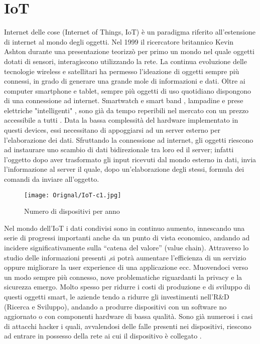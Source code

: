 \chapter{IoT}
Internet delle cose (Internet of Things, IoT) è un paradigma riferito
all’estensione di internet al mondo degli oggetti. Nel 1999 il ricercatore
britannico Kevin Ashton durante una presentazione teorizzò  per primo un mondo
nel quale oggetti dotati di sensori, interagiscono utilizzando la rete.  La
continua evoluzione delle tecnologie wireless e satellitari ha permesso
l'ideazione di oggetti sempre più connessi, in grado di generare una grande mole
di informazioni e dati. Oltre ai computer smartphone e tablet, sempre più
oggetti di uso quotidiano dispongono di una connessione ad internet. Smartwatch
e smart band , lampadine e prese elettriche "intelligenti" ,  sono già da tempo
reperibili nel mercato con un prezzo accessibile a tutti .  Data la bassa
complessità del hardware implementato in questi devices, essi necessitano di
appoggiarsi ad un server esterno per l'elaborazione dei dati.  Sfruttando la
connessione ad internet, gli oggetti riescono ad instaurare uno scambio di dati
bidirezionale tra loro ed il server; infatti l'oggetto dopo aver trasformato gli
input ricevuti dal mondo esterno in dati, invia l'informazione al server il
quale, dopo un'elaborazione degli stessi, formula dei comandi da inviare
all'oggetto.
\\
\begin{figure}[h]
        \centering 
                \texttt{[image: Orignal/IoT-c1.jpg]}
        \caption{Numero di dispositivi per anno}
\end{figure}
Nel mondo dell’IoT i dati condivisi sono in
continuo aumento, innescando una serie di progressi importanti anche da un punto
di vista economico, andando ad incidere  significativamente sulla “catena del
valore” (value chain). Attraverso lo studio delle informazioni presenti ,si
potrà  aumentare l’efficienza di un servizio oppure  migliorare la user experience di una applicazione ecc.  
Muovendoci
verso un modo sempre più connesso, nove problematiche riguardanti la privacy e
la sicurezza emergo.  Molto spesso per ridurre i costi di produzione e di
sviluppo di questi oggetti smart, le aziende tendo a ridurre gli investimenti
nell'R\&D (Ricerca e Sviluppo), andando a produrre dispositivi con un software no
aggiornato o con componenti hardware di bassa qualità.
Sono già numerosi i casi di attacchi hacker i quali, avvalendosi delle falle
presenti nei dispositivi, riescono ad entrare in possesso della rete ai cui il
dispositivo è collegato .

